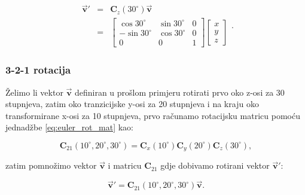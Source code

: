 \documentclass[times, utf8, diplomski, numeric]{templates/template}
\begin{document}
{{{{                \begin{equation}
                \begin{array}{rcl}
                    \overrightarrow{\boldsymbol{v}}' & = & \boldsymbol{C}_{z}(30^{\circ}) \overrightarrow{\boldsymbol{v}} \\
                    & = &
                \begin{bmatrix}
                    \cos30^{\circ}   & \sin30^{\circ}    &  0 \\
                    -\sin30^{\circ}  & \cos30^{\circ}    &  0 \\
                    0                & 0                 &  1
                \end{bmatrix}
                \begin{bmatrix}
                    x \\
                    y \\
                    z
                \end{bmatrix}
                \end{array}
                .
                \end{equation}
            }

            \subsubsection{3-2-1 rotacija}{
                Želimo li vektor $\overrightarrow{\boldsymbol{v}}$ definiran u prošlom primjeru rotirati prvo oko z-osi za 30 stupnjeva, zatim oko tranzicijske y-osi za 20 stupnjeva i na kraju oko transformirane x-osi za 10 stupnjeva, prvo računamo rotacijsku matricu pomoću jednadžbe \ref{eq:euler_rot_mat} kao:

                \begin{equation}
                \boldsymbol{C}_{21}(10^\circ, 20^\circ, 30^\circ) = \boldsymbol{C}_{x}(10^\circ) \boldsymbol{C}_{y}(20^\circ) \boldsymbol{C}_{z}(30^\circ),
                \end{equation}

                zatim pomnožimo vektor $\overrightarrow{\boldsymbol{v}}$ i matricu $\boldsymbol{C}_{21}$ gdje dobivamo rotirani vektor $\overrightarrow{\boldsymbol{v}}'$:

                \begin{equation}
                    \overrightarrow{\boldsymbol{v}}' = \boldsymbol{C}_{21}(10^\circ, 20^\circ, 30^\circ) \overrightarrow{\boldsymbol{v}}.
                \end{equation}
            }
        }
    }

}
\end{document}
